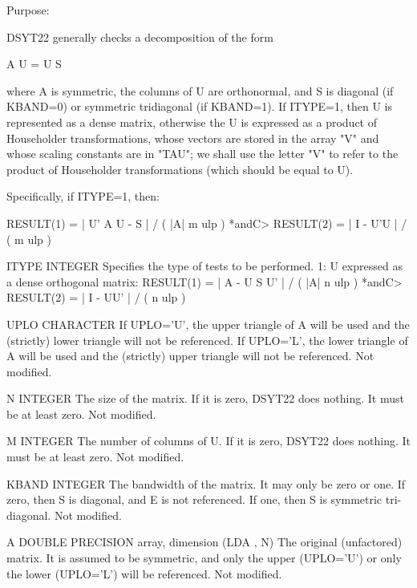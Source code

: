 \begin{DoxyParagraph}{Purpose\+: }
\begin{DoxyVerb}      DSYT22  generally checks a decomposition of the form

              A U = U S

      where A is symmetric, the columns of U are orthonormal, and S
      is diagonal (if KBAND=0) or symmetric tridiagonal (if
      KBAND=1).  If ITYPE=1, then U is represented as a dense matrix,
      otherwise the U is expressed as a product of Householder
      transformations, whose vectors are stored in the array "V" and
      whose scaling constants are in "TAU"; we shall use the letter
      "V" to refer to the product of Householder transformations
      (which should be equal to U).

      Specifically, if ITYPE=1, then:

              RESULT(1) = | U' A U - S | / ( |A| m ulp ) *andC>              RESULT(2) = | I - U'U | / ( m ulp )\end{DoxyVerb}
 \begin{DoxyVerb}  ITYPE   INTEGER
          Specifies the type of tests to be performed.
          1: U expressed as a dense orthogonal matrix:
             RESULT(1) = | A - U S U' | / ( |A| n ulp )   *andC>             RESULT(2) = | I - UU' | / ( n ulp )

  UPLO    CHARACTER
          If UPLO='U', the upper triangle of A will be used and the
          (strictly) lower triangle will not be referenced.  If
          UPLO='L', the lower triangle of A will be used and the
          (strictly) upper triangle will not be referenced.
          Not modified.

  N       INTEGER
          The size of the matrix.  If it is zero, DSYT22 does nothing.
          It must be at least zero.
          Not modified.

  M       INTEGER
          The number of columns of U.  If it is zero, DSYT22 does
          nothing.  It must be at least zero.
          Not modified.

  KBAND   INTEGER
          The bandwidth of the matrix.  It may only be zero or one.
          If zero, then S is diagonal, and E is not referenced.  If
          one, then S is symmetric tri-diagonal.
          Not modified.

  A       DOUBLE PRECISION array, dimension (LDA , N)
          The original (unfactored) matrix.  It is assumed to be
          symmetric, and only the upper (UPLO='U') or only the lower
          (UPLO='L') will be referenced.
          Not modified.


\end{DoxyVerb}
\end{DoxyParagraph}
